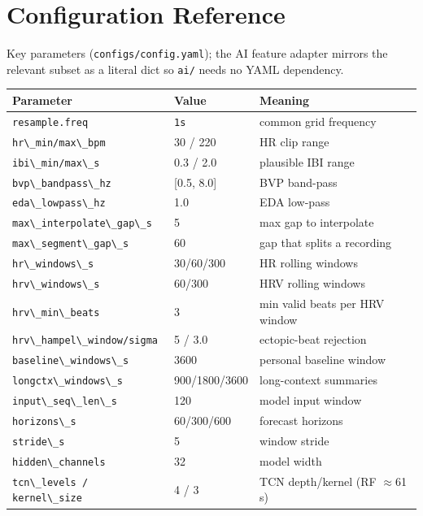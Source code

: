 \documentclass[11pt,a4paper]{article}
\newcommand{\code}[1]{\lstinline[basicstyle=\ttfamily\normalsize]!#1!}
\begin{document}
\section{Configuration Reference}

Key parameters (\code{configs/config.yaml}); the AI feature adapter mirrors the
relevant subset as a literal dict so \code{ai/} needs no YAML dependency.

\begin{longtable}{@{}p{}p{}p{}@{}}
\toprule
\textbf{Parameter} & \textbf{Value} & \textbf{Meaning} \\
\midrule
\endhead
\code{resample.freq} & \code{1s} & common grid frequency \\
\code{hr\_min/max\_bpm} & 30 / 220 & HR clip range \\
\code{ibi\_min/max\_s} & 0.3 / 2.0 & plausible IBI range \\
\code{bvp\_bandpass\_hz} & [0.5, 8.0] & BVP band-pass \\
\code{eda\_lowpass\_hz} & 1.0 & EDA low-pass \\
\code{max\_interpolate\_gap\_s} & 5 & max gap to interpolate \\
\code{max\_segment\_gap\_s} & 60 & gap that splits a recording \\
\code{hr\_windows\_s} & 30/60/300 & HR rolling windows \\
\code{hrv\_windows\_s} & 60/300 & HRV rolling windows \\
\code{hrv\_min\_beats} & 3 & min valid beats per HRV window \\
\code{hrv\_hampel\_window/sigma} & 5 / 3.0 & ectopic-beat rejection \\
\code{baseline\_windows\_s} & 3600 & personal baseline window \\
\code{longctx\_windows\_s} & 900/1800/3600 & long-context summaries \\
\code{input\_seq\_len\_s} & 120 & model input window \\
\code{horizons\_s} & 60/300/600 & forecast horizons \\
\code{stride\_s} & 5 & window stride \\
\code{hidden\_channels} & 32 & model width \\
\code{tcn\_levels / kernel\_size} & 4 / 3 & TCN depth/kernel (RF $\approx$61\,s) \\

\end{longtable}
\end{document}
